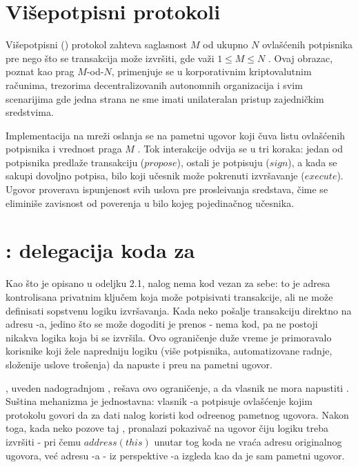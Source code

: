 \section{Vi\v sepotpisni protokoli}

Vi\v sepotpisni () protokol zahteva saglasnost $M$ od ukupno $N$ ovla\v s\' cenih potpisnika pre nego \v sto se transakcija mo\v ze izvr\v siti, gde va\v zi $1 \leq M \leq N$ \cite{bip11}. Ovaj obrazac, poznat kao prag $M$-od-$N$, primenjuje se u korporativnim kriptovalutnim ra\v cunima, trezorima decentralizovanih autonomnih organizacija i svim scenarijima gde jedna strana ne sme imati unilateralan pristup zajedni\v ckim sredstvima.

Implementacija na  mre\v zi oslanja se na pametni ugovor koji \v cuva listu ovla\v s\' cenih potpisnika i vrednost praga $M$ \cite{gnosissafe2023}. Tok interakcije odvija se u tri koraka: jedan od potpisnika predla\v ze transakciju ($propose$), ostali je potpisuju ($sign$), a kada se sakupi dovoljno potpisa, bilo koji u\v cesnik mo\v ze pokrenuti izvr\v savanje ($execute$). Ugovor proverava ispunjenost svih uslova pre prosle\dj ivanja sredstava, \v cime se elimini\v se zavisnost od poverenja u bilo kojeg pojedina\v cnog u\v cesnika.

\section{: delegacija koda za }

Kao \v sto je opisano u odeljku 2.1,  nalog nema kod vezan za sebe: to je adresa kontrolisana privatnim klju\v cem koja mo\v ze potpisivati transakcije, ali ne mo\v ze definisati sopstvenu logiku izvr\v savanja. Kada neko po\v salje transakciju direktno na adresu -a, jedino \v sto se mo\v ze dogoditi je prenos  -  nema kod, pa ne postoji nikakva logika koja bi se izvr\v sila. Ovo ograni\v cenje du\v ze vreme je primoravalo korisnike koji \v zele napredniju logiku (vi\v se potpisnika, automati\-zovane radnje, slo\v zenije uslove tro\v senja) da napuste  i pre\dj u na pametni ugovor.

 \cite{eip7702}, uveden  nadogradnjom  \cite{pectra2025}, re\v sava ovo ograni\v cenje, a da vlasnik ne mora napustiti . Su\v stina mehanizma je jednostavna: vlasnik -a potpisuje ovla\v s\' cenje kojim protokolu govori da za dati nalog koristi kod odre\dj enog pametnog ugovora. Nakon toga, kada neko pozove taj , pronalazi pokaziva\v c na ugovor \v ciju logiku treba izvr\v siti - pri \v cemu $address(this)$ unutar tog koda ne vra\' ca adresu originalnog ugovora, ve\' c adresu -a - iz perspektive -a izgleda kao da je  sam pametni ugovor.

